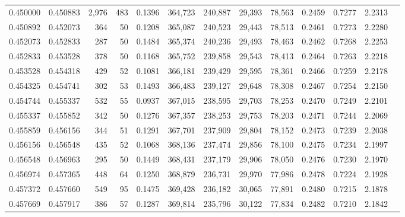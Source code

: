 \begin{tabular}{rrrrrrrrrrrrr}
0.450000 & 0.450883 & 2,976 & 483 &                                     0.1396 & 364,723 & 240,887 &  29,393 &  78,563 & 0.2459 & 0.7277 & 2.2313 \\
0.450892 & 0.452073 &   364 &  50 &                                     0.1208 & 365,087 & 240,523 &  29,443 &  78,513 & 0.2461 & 0.7273 & 2.2280 \\
0.452073 & 0.452833 &   287 &  50 &                                     0.1484 & 365,374 & 240,236 &  29,493 &  78,463 & 0.2462 & 0.7268 & 2.2253 \\
0.452833 & 0.453528 &   378 &  50 &                                     0.1168 & 365,752 & 239,858 &  29,543 &  78,413 & 0.2464 & 0.7263 & 2.2218 \\
0.453528 & 0.454318 &   429 &  52 &                                     0.1081 & 366,181 & 239,429 &  29,595 &  78,361 & 0.2466 & 0.7259 & 2.2178 \\
0.454325 & 0.454741 &   302 &  53 &                                     0.1493 & 366,483 & 239,127 &  29,648 &  78,308 & 0.2467 & 0.7254 & 2.2150 \\
0.454744 & 0.455337 &   532 &  55 &                                     0.0937 & 367,015 & 238,595 &  29,703 &  78,253 & 0.2470 & 0.7249 & 2.2101 \\
0.455337 & 0.455852 &   342 &  50 &                                     0.1276 & 367,357 & 238,253 &  29,753 &  78,203 & 0.2471 & 0.7244 & 2.2069 \\
0.455859 & 0.456156 &   344 &  51 &                                     0.1291 & 367,701 & 237,909 &  29,804 &  78,152 & 0.2473 & 0.7239 & 2.2038 \\
0.456156 & 0.456548 &   435 &  52 &                                     0.1068 & 368,136 & 237,474 &  29,856 &  78,100 & 0.2475 & 0.7234 & 2.1997 \\
0.456548 & 0.456963 &   295 &  50 &                                     0.1449 & 368,431 & 237,179 &  29,906 &  78,050 & 0.2476 & 0.7230 & 2.1970 \\
0.456974 & 0.457365 &   448 &  64 &                                     0.1250 & 368,879 & 236,731 &  29,970 &  77,986 & 0.2478 & 0.7224 & 2.1928 \\
0.457372 & 0.457660 &   549 &  95 &                                     0.1475 & 369,428 & 236,182 &  30,065 &  77,891 & 0.2480 & 0.7215 & 2.1878 \\
0.457669 & 0.457917 &   386 &  57 &                                     0.1287 & 369,814 & 235,796 &  30,122 &  77,834 & 0.2482 & 0.7210 & 2.1842 \\

\end{tabular}
